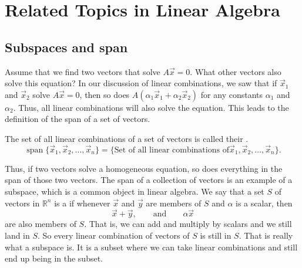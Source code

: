 \section{Related Topics in Linear Algebra} \label{sec:kernel}



\subsection{Subspaces and span}
Assume that we find two vectors that solve $A\vec{x} = 0$. What other vectors also solve this equation? In our discussion of linear combinations, we saw that if $\vec{x}_1$ and $\vec{x}_2$ solve $A\vec{x} = 0$, then so does $A(\alpha_1\vec{x}_1 + \alpha_2\vec{x}_2)$ for any constants $\alpha_1$ and $\alpha_2$. Thus, all linear combinations will also solve the equation. This leads to the definition of the span of a set of vectors.

\begin{definition}
The set of all linear combinations of a set of vectors is called their
\emph{}.
\begin{equation*}
\operatorname{span} \bigl\{ \vec{x}_1, \vec{x}_2 , \ldots , \vec{x}_n \bigr\}
=
\bigl\{
\text{Set of all linear combinations of
$\vec{x}_1, \vec{x}_2 , \ldots , \vec{x}_n$}
\bigr\} .
\end{equation*}
\end{definition}

Thus, if two vectors solve a homogeneous equation, so does everything in the span of those two vectors. The span of a collection of vectors is an example of a subspace, which is a common object in linear algebra. We say that a set $S$ of vectors in ${\mathbb R}^n$ is a
\emph{} if
whenever $\vec{x}$ and $\vec{y}$ are members of $S$ and
$\alpha$ is a scalar, then
\begin{equation*}
\vec{x} + \vec{y}, \qquad \text{and} \qquad \alpha \vec{x}
\end{equation*}
are also members of $S$.  That is, we can add and multiply by scalars
and we still land in $S$.  So every linear combination of vectors of
$S$ is still in $S$.  That is really what a subspace is.  It is a subset
where we can take linear combinations and still end up being in the subset.

